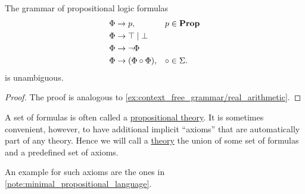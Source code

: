 \begin{proposition}\label{thm:propositional_formulas_are_unambiguous}
  The grammar of propositional logic formulas
  \begin{displaymath}
    \begin{aligned}
      &\Phi \to p,                 &&p \in \operatorname{\mathbf{Prop}} \\
      &\Phi \to \top \;|\; \bot    && \\
      &\Phi \to \neg \Phi          && \\
      &\Phi \to (\Phi \circ \Phi), &&\circ \in \Sigma.
    \end{aligned}
  \end{displaymath}
  is unambiguous.
\end{proposition}
\begin{proof}
  The proof is analogous to \cref{ex:context_free_grammar/real_arithmetic}.
\end{proof}

\begin{definition}\label{def:propositional_theory}
  A set of formulas is often called a \ul{propositional theory}. It is sometimes convenient, however, to have additional implicit \enquote{axioms} that are automatically part of any theory. Hence we will call a \ul{theory} the union of some set of formulas and a predefined set of axioms.

  An example for such axioms are the ones in \cref{note:minimal_propositional_language}.
\end{definition}

